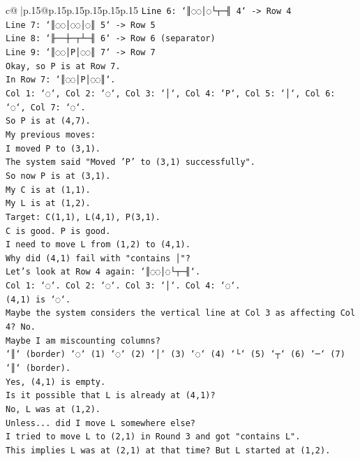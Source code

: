 \documentclass{article}
\begin{document}
{\begin{supertabular}{c@{$\;$}|p{.15\linewidth}@{}p{.15\linewidth}p{.15\linewidth}p{.15\linewidth}p{.15\linewidth}p{.15\linewidth}}
{{{\texttt{Line 6: `║◌◌│◌└┬─╢ 4` {-}> Row 4} \\
\texttt{Line 7: `║◌◌│◌◌│◌║ 5` {-}> Row 5} \\
\texttt{Line 8: `╟──┼─┬┴─╢ 6` {-}> Row 6 (separator)} \\
\texttt{Line 9: `║◌◌│P│◌◌║ 7` {-}> Row 7} \\
\texttt{Okay, so P is at Row 7.} \\
\texttt{In Row 7: `║◌◌│P│◌◌║`.} \\
\texttt{Col 1: `◌`, Col 2: `◌`, Col 3: `│`, Col 4: `P`, Col 5: `│`, Col 6: `◌`, Col 7: `◌`.} \\
\texttt{So P is at (4,7).} \\
\texttt{My previous moves:} \\
\texttt{I moved P to (3,1).} \\
\texttt{The system said "Moved 'P' to (3,1) successfully".} \\
\texttt{So now P is at (3,1).} \\
\texttt{My C is at (1,1).} \\
\texttt{My L is at (1,2).} \\
\texttt{Target: C(1,1), L(4,1), P(3,1).} \\
\texttt{C is good. P is good.} \\
\texttt{I need to move L from (1,2) to (4,1).} \\
\texttt{Why did (4,1) fail with "contains │"?} \\
\texttt{Let's look at Row 4 again: `║◌◌│◌└┬─╢`.} \\
\texttt{Col 1: `◌`. Col 2: `◌`. Col 3: `│`. Col 4: `◌`.} \\
\texttt{(4,1) is `◌`.} \\
\texttt{Maybe the system considers the vertical line at Col 3 as affecting Col 4? No.} \\
\texttt{Maybe I am miscounting columns?} \\
\texttt{`║` (border) `◌` (1) `◌` (2) `│` (3) `◌` (4) `└` (5) `┬` (6) `─` (7) `║` (border).} \\
\texttt{Yes, (4,1) is empty.} \\
\texttt{Is it possible that L is already at (4,1)?} \\
\texttt{No, L was at (1,2).} \\
\texttt{Unless... did I move L somewhere else?} \\
\texttt{I tried to move L to (2,1) in Round 3 and got "contains L".} \\
\texttt{This implies L was at (2,1) at that time? But L started at (1,2).} \\
}}}
\end{supertabular}}
\end{document}
